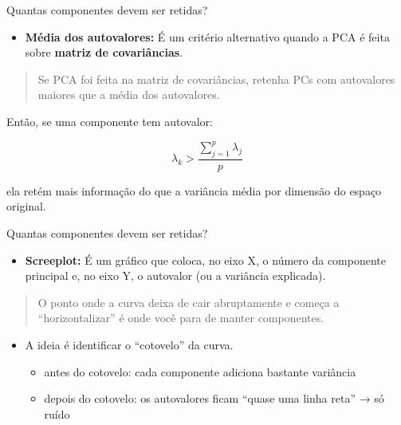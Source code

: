\documentclass[
  ignorenonframetext,
  aspectratio=169,
]{beamer}
\providecommand{\tightlist}{%
  \setlength{\itemsep}{0pt}\setlength{\parskip}{0pt}}
\begin{document}
\begin{frame}{Quantas componentes devem ser retidas?}
\label{quantas-componentes-devem-ser-retidas-1}
\begin{itemize}
\tightlist
\item
  \textbf{Média dos autovalores:} É um critério alternativo quando a PCA
  é feita sobre \textbf{matriz de covariâncias}.
\end{itemize}

\begin{quote}
Se PCA foi feita na matriz de covariâncias, retenha PCs com autovalores
maiores que a média dos autovalores.
\end{quote}

Então, se uma componente tem autovalor:

\[\lambda_k > \dfrac{\sum \limits_{j=1}^p \lambda_j}{p}\]

ela retém mais informação do que a variância média por dimensão do
espaço original.
\end{frame}

\begin{frame}{Quantas componentes devem ser retidas?}
\label{quantas-componentes-devem-ser-retidas-2}
\begin{itemize}
\tightlist
\item
  \textbf{Screeplot:} É um gráfico que coloca, no eixo X, o número da
  componente principal e, no eixo Y, o autovalor (ou a variância
  explicada).
\end{itemize}

\begin{quote}
O ponto onde a curva deixa de cair abruptamente e começa a
``horizontalizar'' é onde você para de manter componentes.
\end{quote}

\begin{itemize}
\tightlist
\item
  A ideia é identificar o ``cotovelo'' da curva.

  \begin{itemize}
  \tightlist
  \item
    antes do cotovelo: cada componente adiciona bastante variância
  \item
    depois do cotovelo: os autovalores ficam ``quase uma linha reta'' →
    só ruído
  \end{itemize}
\end{itemize}
\end{frame}
\end{document}
